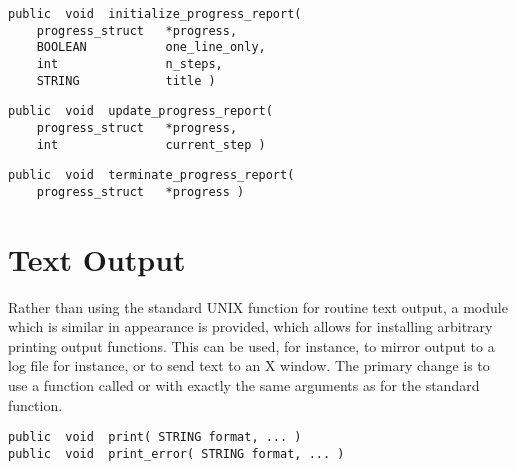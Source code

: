 {\bf\begin{verbatim}
public  void  initialize_progress_report(
    progress_struct   *progress,
    BOOLEAN           one_line_only,
    int               n_steps,
    STRING            title )
\end{verbatim}}


{\bf\begin{verbatim}
public  void  update_progress_report(
    progress_struct   *progress,
    int               current_step )
\end{verbatim}}


{\bf\begin{verbatim}
public  void  terminate_progress_report(
    progress_struct   *progress )
\end{verbatim}}


\section{Text Output}

Rather than using the standard UNIX function  for routine
text output, a module which is similar in appearance is provided,
which allows for installing arbitrary printing output functions.  This
can be used, for instance, to mirror output to a log file for
instance, or to send text to an X window.  The primary change is to
use a function called  or  with exactly the
same arguments as for the standard  function.

{\bf\begin{verbatim}
public  void  print( STRING format, ... )
public  void  print_error( STRING format, ... )
\end{verbatim}}

